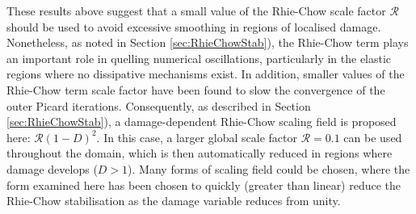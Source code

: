\documentclass[sn-mathphys,Numbered]{sn-jnl}%
\begin{document}
These results above suggest that a small value of the Rhie-Chow scale factor $\mathcal{R}$ should be used to avoid excessive smoothing in regions of localised damage.
Nonetheless, as noted in Section \ref{sec:RhieChowStab}), the Rhie-Chow term plays an important role in quelling numerical oscillations, particularly in the elastic regions where no dissipative mechanisms exist.
In addition, smaller values of the Rhie-Chow term scale factor have been found to slow the convergence of the outer Picard iterations.
Consequently, as described in Section \ref{sec:RhieChowStab}), a damage-dependent Rhie-Chow scaling field is proposed here: $\mathcal{R} (1-D)^2$.
In this case, a larger global scale factor $\mathcal{R} = 0.1$ can be used throughout the domain, which is then automatically reduced in regions where damage develops ($D > 1$).
Many forms of scaling field could be chosen, where the form examined here has been chosen to quickly (greater than linear) reduce the Rhie-Chow stabilisation as the damage variable reduces from unity.
\end{document}
